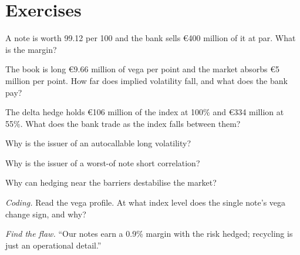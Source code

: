 \section{Exercises}

\begin{exercise}[$\star$]\label{exo:s2:hedging-a-structured-products-book:1}
A note is worth 99.12 per 100 and the bank sells \euro400 million of it at par. What is the margin?
\end{exercise}

\begin{exercise}[$\star$]\label{exo:s2:hedging-a-structured-products-book:2}
The book is long \euro9.66 million of vega per point and the market absorbs \euro5 million per point. How far does implied volatility fall, and
what does the bank pay?
\end{exercise}

\begin{exercise}[$\star$]\label{exo:s2:hedging-a-structured-products-book:3}
The delta hedge holds \euro106 million of the index at 100\% and \euro334 million at 55\%. What does the bank trade as the index falls between them?
\end{exercise}

\begin{exercise}[$\star\star$]\label{exo:s2:hedging-a-structured-products-book:4}
Why is the issuer of an autocallable long volatility?
\end{exercise}

\begin{exercise}[$\star\star$]\label{exo:s2:hedging-a-structured-products-book:5}
Why is the issuer of a worst-of note short correlation?
\end{exercise}

\begin{exercise}[$\star\star$]\label{exo:s2:hedging-a-structured-products-book:6}
Why can hedging near the barriers destabilise the market?
\end{exercise}

\begin{exercise}[$\star\star\star$]\label{exo:s2:hedging-a-structured-products-book:7}
\emph{Coding.} Read the vega profile. At what index level does the single note's vega change sign, and why?
\end{exercise}

\begin{exercise}[$\star\star\star$]\label{exo:s2:hedging-a-structured-products-book:8}
\emph{Find the flaw.} ``Our notes earn a 0.9\% margin with the risk hedged; recycling is just an operational detail.''
\end{exercise}

